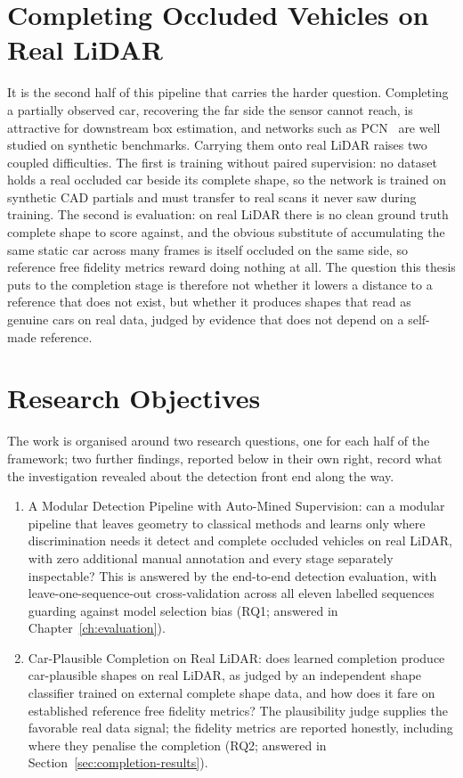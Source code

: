 \documentclass[a4paper,12pt]{report}
\begin{document}
\section{Completing Occluded Vehicles on Real LiDAR}
\label{sec:intro-challenges}

It is the second half of this pipeline that carries the harder question. Completing a
partially observed car, recovering the far side the sensor cannot reach, is attractive
for downstream box estimation, and networks such as
PCN~\cite{yuan2019pcnpointcompletionnetwork} are well studied on synthetic benchmarks.
Carrying them onto real LiDAR raises two coupled difficulties. The first is training
without paired supervision: no dataset holds a real occluded car beside its complete
shape, so the network is trained on synthetic CAD partials and must transfer to real
scans it never saw during training. The second is evaluation: on real LiDAR there is no
clean ground truth complete shape to score against, and the obvious substitute of
accumulating the same static car across many frames is itself occluded on the same side,
so reference free fidelity metrics reward doing nothing at all. The question this thesis
puts to the completion stage is therefore not whether it lowers a distance to a
reference that does not exist, but whether it produces shapes that read as genuine cars
on real data, judged by evidence that does not depend on a self-made reference.

\section{Research Objectives}
\label{sec:intro-objectives}

The work is organised around two research questions, one for each half of the
framework; two further findings, reported below in their own right, record what the
investigation revealed about the detection front end along the way.

\begin{enumerate}
  \item A Modular Detection Pipeline with Auto-Mined Supervision:
    can a modular pipeline that leaves geometry to classical methods and learns only
    where discrimination needs it detect and complete occluded vehicles on real LiDAR,
    with zero additional manual annotation and every stage separately inspectable? This is
    answered by the end-to-end detection evaluation, with leave-one-sequence-out
    cross-validation across all eleven labelled sequences guarding against
    model selection bias (RQ1; answered in Chapter~\ref{ch:evaluation}).
  \item Car-Plausible Completion on Real LiDAR:
    does learned completion produce car-plausible shapes on real LiDAR, as judged by an
    independent shape classifier trained on external complete shape data, and how
    does it fare on established reference free fidelity metrics? The plausibility judge
    supplies the favorable real data signal; the fidelity metrics are reported honestly,
    including where they penalise the completion (RQ2; answered in
    Section~\ref{sec:completion-results}).
\end{enumerate}
\end{document}
